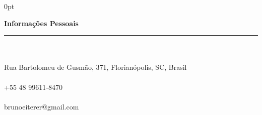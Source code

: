 \documentclass[a4paper]{article}
\begin{document}
\begin{adjustwidth}{\parindent}{0pt}
\begin{minipage}[t]{0.65\textwidth}
\end{minipage} \hspace{0.03\textwidth}
\begin{minipage}[t]{0.25\textwidth}
  \raggedright
  \Large{\textbf{Informações Pessoais}} \normalsize \\ \rule{\textwidth}{0.5pt} \\ \hspace{0pt} \\
   \small{Rua Bartolomeu de Gusmão, 371, Florianópolis, SC, Brasil} \\ \hspace{0pt} \\
   \small{+55 48 99611-8470} \\ \hspace{0pt} \\
  \small{brunoeiterer@gmail.com} \\ \hspace{0pt} \\

\end{minipage}
\end{adjustwidth}
\end{document}
